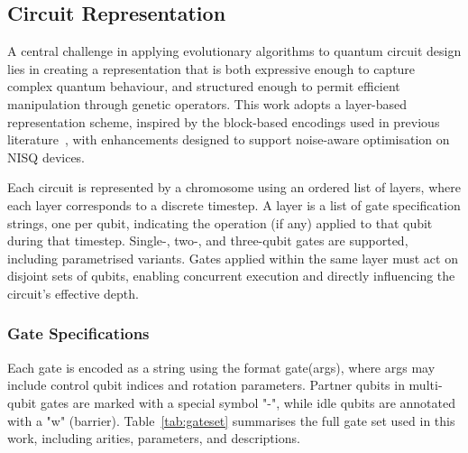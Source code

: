 \documentclass[11pt,a4paper]{article}
\begin{document}
\subsection{Circuit Representation}
A central challenge in applying evolutionary algorithms to quantum circuit design lies in creating a representation that is both expressive enough to capture complex quantum behaviour, and structured enough to permit efficient manipulation through genetic operators. This work adopts a layer-based representation scheme, inspired by the block-based encodings used in previous literature~\cite{Lukac2002EvolvingQC}, with enhancements designed to support noise-aware optimisation on NISQ devices.\newline

Each circuit is represented by a chromosome using an ordered list of layers, where each layer corresponds to a discrete timestep. A layer is a list of gate specification strings, one per qubit, indicating the operation (if any) applied to that qubit during that timestep. Single-, two-, and three-qubit gates are supported, including parametrised variants. Gates applied within the same layer must act on disjoint sets of qubits, enabling concurrent execution and directly influencing the circuit’s effective depth.

\subsubsection*{Gate Specifications} Each gate is encoded as a string using the format gate(args), where args may include control qubit indices and rotation parameters. Partner qubits in multi-qubit gates are marked with a special symbol "-", while idle qubits are annotated with a "w" (barrier). Table~\ref{tab:gateset} summarises the full gate set used in this work, including arities, parameters, and descriptions.
\end{document}
